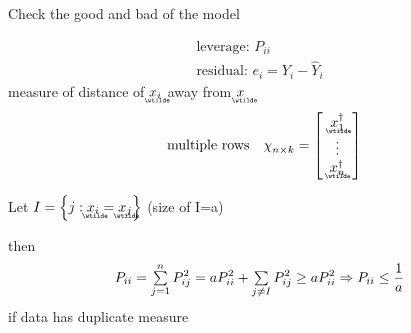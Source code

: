 \documentclass{article}
\begin{document}
\bigskip

Check the good and bad of the model

\begin{equation*}
\begin{array}{c}
\text{leverage: }P_{ii} \\ 
\text{residual: }e_{i}=Y_{i}-\hat{Y}_{i}%
\end{array}%
\end{equation*}%
measure of distance of $%
\underaccent{\wtilde}{x}%
_{i}$ away from $%
\underaccent{\wtilde}{x}%
$%
\begin{equation*}
\text{multiple rows\quad }\chi _{n\times k}=\left[ 
\begin{array}{c}
\underaccent{\wtilde}{x}%
_{1}^{\dagger } \\ 
\vdots \\ 
\underaccent{\wtilde}{x}%
_{n}^{\dagger }%
\end{array}%
\right]
\end{equation*}

Let $I=\left\{ j:%
\underaccent{\wtilde}{x}%
_{i}=%
\underaccent{\wtilde}{x}%
_{j}\right\} $ (size of I=a)

then%
\begin{equation*}
P_{ii}=\mathop{\textstyle \sum }\limits_{j=1}^{n}P_{ij}^{2}=aP_{ii}^{2}+\mathop{\textstyle \sum }\limits_{j\neq
I}P_{ij}^{2}\geq aP_{ii}^{2}\Rightarrow P_{ii}\leq \frac{1}{a}
\end{equation*}%
if data has duplicate measure

\bigskip
\end{document}
